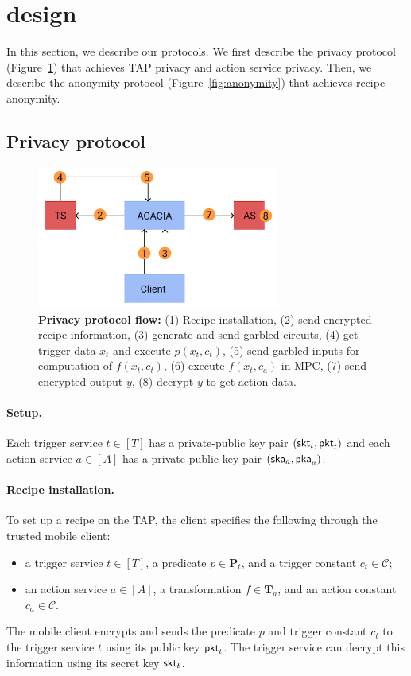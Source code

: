 \section{\sys design}
\label{sec:design}

In this section, we describe our \sys protocols. We first describe the privacy
protocol (Figure~\ref{fig:privacy}) that achieves TAP privacy and action service
privacy. Then, we describe the anonymity protocol (Figure~\ref{fig:anonymity})
that achieves recipe anonymity.

\subsection{Privacy protocol}
\label{sec:privacy}

\begin{figure}
\includegraphics[width=8cm]{graphics/ACACIA.png}
\caption{\textbf{Privacy protocol flow:} (1) Recipe
  installation, (2) send encrypted recipe information, (3) generate and send
  garbled circuits, (4) get trigger data $x_t$ and execute $p(x_t, c_t)$, (5)
  send garbled inputs for computation of $f(x_t, c_t)$, (6) execute $f(x_t,
  c_a)$ in MPC, (7) send encrypted output $y$, (8) decrypt $y$ to get action
  data.}
\label{fig:privacy}
\end{figure}

\paragraph{Setup.}
Each trigger service $t \in [T]$ has a private-public key pair $(\mathsf{skt}_t,
\mathsf{pkt}_t)$ and each action service $a \in [A]$ has a private-public key pair
$(\mathsf{ska}_a, \mathsf{pka}_a)$.

\paragraph{Recipe installation.}
To set up a recipe on the TAP, the client specifies the following through the
trusted mobile client:
\begin{itemize}
  \item a trigger service $t \in [T]$, a predicate $p \in \mathbf{P}_t$, and a
    trigger constant $c_t \in \mathcal{C}$;
  \item an action service $a \in [A]$, a transformation $f \in \mathbf{T}_a$,
    and an action constant $c_a \in \mathcal{C}$.
\end{itemize}
The mobile client encrypts and sends the predicate $p$ and trigger constant
$c_t$ to the trigger service $t$ using its public key $\mathsf{pkt}_t$. The trigger
service can decrypt this information using its secret key $\mathsf{skt}_t$.

